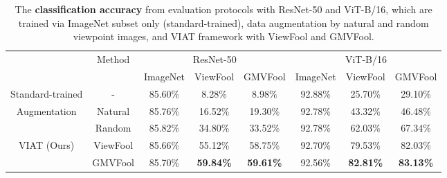 \documentclass[10pt,journal,compsoc]{IEEEtran}
\begin{document}
\begin{table}[t]
\caption{The \textbf{classification accuracy} from evaluation protocols with ResNet-50 and ViT-B/16, which are trained via ImageNet subset only (standard-trained), data augmentation by natural and random viewpoint images, and VIAT framework with ViewFool and GMVFool.}
\vspace{-0.3cm}
\setlength\tabcolsep{9.3pt}
\renewcommand\arraystretch{1.2}
\centering
\begin{tabular}{c|c|ccc|ccc}
\hline
\multirow{2}{*}{}        & \multirow{2}{*}{Method} & \multicolumn{3}{c|}{ResNet-50}                                                                                      & \multicolumn{3}{c}{ViT-B/16}                                                                                           \\ \cline{3-8} 
                         &                         & \multicolumn{1}{c|}{ImageNet} & \multicolumn{1}{c|}{ViewFool}       & GMVFool        & \multicolumn{1}{c|}{ImageNet} & \multicolumn{1}{c|}{ViewFool}       & GMVFool        \\ \hline \hline
Standard-trained                 & -                       & \multicolumn{1}{c|}{85.60\%}    & \multicolumn{1}{c|}{8.28\%}           & 8.98\%           & \multicolumn{1}{c|}{92.88\%}    & \multicolumn{1}{c|}{25.70\%}          & 29.10\%          \\ \hline
\multirow{2}{*}{Augmentation} & Natural                 & \multicolumn{1}{c|}{85.76\%}   & \multicolumn{1}{c|}{16.52\%}          & 19.30\%          & \multicolumn{1}{c|}{92.78\%}   & \multicolumn{1}{c|}{43.32\%}          & 46.48\%          \\
                         & Random                  & \multicolumn{1}{c|}{85.82\%}    & \multicolumn{1}{c|}{34.80\%}          & 33.52\%          & \multicolumn{1}{c|}{92.78\%}    & \multicolumn{1}{c|}{62.03\%}          & 67.34\%          \\ \hline
\multirow{2}{*}{VIAT (Ours)}    & ViewFool                & \multicolumn{1}{c|}{85.66\%}    & \multicolumn{1}{c|}{55.12\%}          & 58.75\%          & \multicolumn{1}{c|}{92.70\%}   & \multicolumn{1}{c|}{79.53\%}          & 82.03\%          \\
                         & GMVFool                 & \multicolumn{1}{c|}{85.70\%}   & \multicolumn{1}{c|}{\textbf{59.84\%}} & \textbf{59.61\%} & \multicolumn{1}{c|}{92.56\%}  & \multicolumn{1}{c|}{\textbf{82.81\%}} & \textbf{83.13\%} \\ \hline
\end{tabular}
\vspace{-0.3cm}
\label{table:defense}
\end{table}
\end{document}
